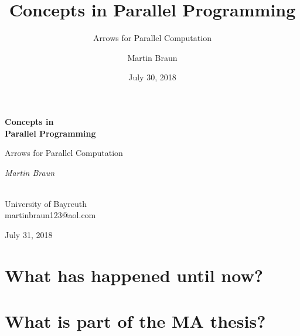 \documentclass{beamer}
\title{Concepts in Parallel Programming}
\subtitle{Arrows for Parallel Computation}
\author{Martin Braun}
\date{July 30, 2018}
\begin{document}
	\begin{frame}[fragile]
		\centering
		\vspace{0.75cm}
		{\huge\bfseries Concepts in\\Parallel Programming\par}
		\vspace{0.5cm}
		{\Large Arrows for Parallel Computation\par}
		{\vspace{0.5cm}}
		{\Large\itshape Martin Braun\par}
		~\\
		University of Bayreuth\\
		martinbraun123@aol.com
		\vspace{0.5cm}
		
		\vfill
		
		{\large July 31, 2018\par}
	\end{frame}
	\begin{frame}
		\tableofcontents
	\end{frame}
	\section{What has happened until now?}
	
	
	
	
	\section{What is part of the MA thesis?}
	
	
	
	
	
\end{document}
